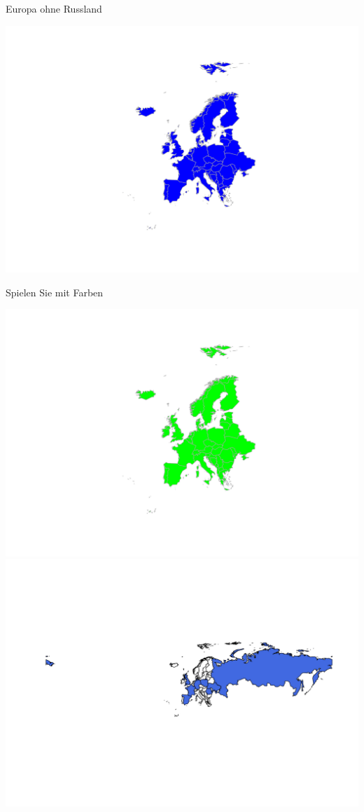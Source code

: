 \documentclass[ignorenonframetext,]{beamer}
\begin{document}
\begin{frame}{Europa ohne Russland}

\includegraphics{Geomedizin_files/figure-beamer/unnamed-chunk-97-1.pdf}

\end{frame}

\begin{frame}{Spielen Sie mit Farben}

\includegraphics{Geomedizin_files/figure-beamer/unnamed-chunk-98-1.pdf}
\includegraphics{Geomedizin_files/figure-beamer/unnamed-chunk-98-2.pdf}

\end{frame}
\end{document}

